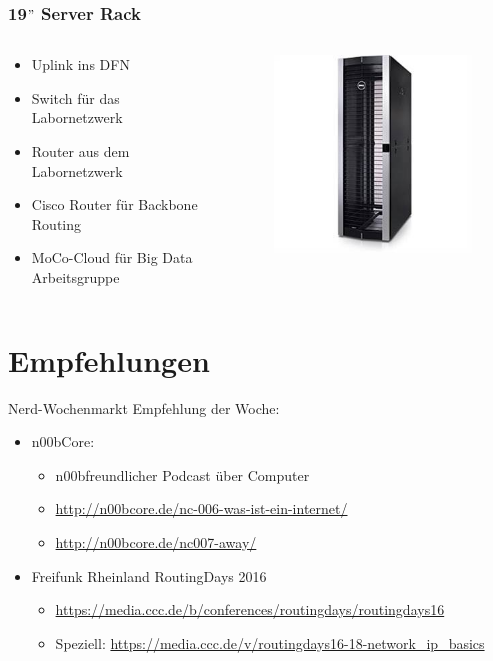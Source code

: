 \documentclass[xcolor=dvipsnames, aspectratio=169]{beamer}
\begin{document}
\begin{frame}
	\frametitle{19$"$ Server Rack}
	\begin{columns}
		\begin{column}{0.5\textwidth}
	\begin{itemize}
		\item Uplink ins DFN
		\item Switch für das Labornetzwerk
		\item Router aus dem Labornetzwerk
		\item Cisco Router für Backbone Routing
		\item MoCo-Cloud für Big Data Arbeitsgruppe
	\end{itemize}
	\end{column}
	\begin{column}{0.5\textwidth}  %
	\vspace{-1cm}
\begin{figure}%
    \centering
	\includegraphics[scale=0.5]{dell}
\end{figure}
\end{column}
\end{columns}
\end{frame}

\section{Empfehlungen}
\begin{frame}{Nerd-Wochenmarkt}
Empfehlung der Woche:
\begin{itemize}
	\item n00bCore:
	\begin{itemize}
		\item \glqq n00bfreundlicher Podcast über Computer\grqq
		\item \url{http://n00bcore.de/nc-006-was-ist-ein-internet/}
	 	\item \url{http://n00bcore.de/nc007-away/} 
	\end{itemize}
	\item Freifunk Rheinland RoutingDays 2016
	\begin{itemize}
		\item \url{https://media.ccc.de/b/conferences/routingdays/routingdays16}
		\item Speziell: \url{https://media.ccc.de/v/routingdays16-18-network_ip_basics}
	\end{itemize}
\end{itemize}
\end{frame}
\end{document}
